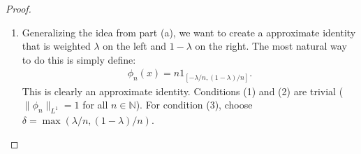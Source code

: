 \documentclass[12pt]{article}
\theoremstyle{remark}
\theoremstyle{named}
\renewcommand{\d}{\delta}
\newcommand{\N}{\mathbb N}
\begin{document}
\begin{proof}
\begin{enumerate}
        \item Generalizing the idea from part (a), we want to create a approximate identity that is weighted \(\lambda\) on the left and \(1 - \lambda\) on the right. The most natural way to do this is simply define:
        \begin{align*}
            \phi_n(x) = n 1_{[-\lambda / n, (1 - \lambda) / n]}.
        \end{align*}
        This is clearly an approximate identity. Conditions (1) and (2) are trivial (\(\|\phi_n\|_{L^1} = 1\) for all \(n \in \N\)). For condition (3), choose \(\d = \max(\lambda/n, (1 - \lambda) / n)\).
    \end{enumerate}
\end{proof}
\end{document}
